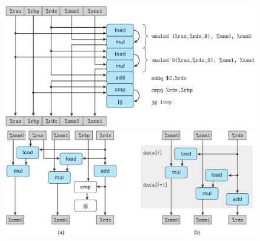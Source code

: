 \begin{figure}[!ht]
    \centering
    \begin{minipage}{0.65\textwidth}
        \centering
        \includegraphics[width=\textwidth]{img/5-8}
        \includegraphics[width=\textwidth]{img/5-9}
    \end{minipage}
    \begin{minipage}{0.33\textwidth}
        \centering

\end{minipage}
\end{figure}
